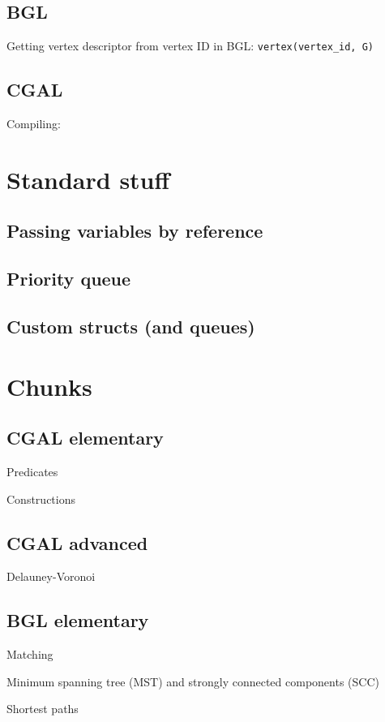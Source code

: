 \documentclass[a4paper,titlepage]{article}
\begin{document}
\subsection{BGL}
Getting vertex descriptor from vertex ID in BGL: \verb+vertex(vertex_id, G)+

\subsection{CGAL}

Compiling:


\newpage\section{Standard stuff}
\subsection{Passing variables by reference}

\subsection{Priority queue}

\subsection{Custom structs (and queues)}



\newpage\section{Chunks}
\subsection*{CGAL elementary}
Predicates

Constructions

\subsection*{CGAL advanced}
Delauney-Voronoi

\subsection*{BGL elementary}
Matching

Minimum spanning tree (MST) and strongly connected components (SCC)

Shortest paths

\end{document}
